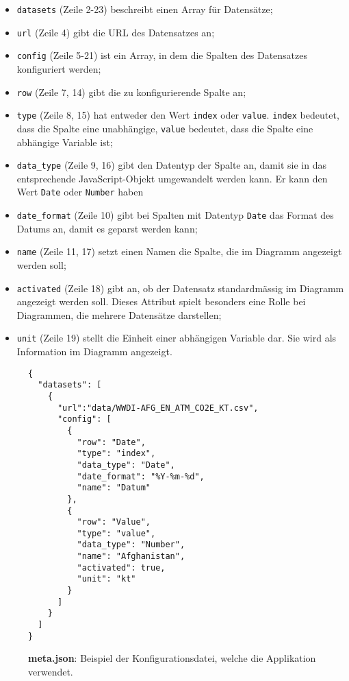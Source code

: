 \begin{itemize}
	\item \texttt{datasets} (Zeile 2-23) beschreibt einen Array für Datensätze;
	\item \texttt{url} (Zeile 4) gibt die URL des Datensatzes an;
	\item \texttt{config} (Zeile 5-21) ist ein Array, in dem die Spalten des Datensatzes konfiguriert werden;
	\item \texttt{row} (Zeile 7, 14) gibt die zu konfigurierende Spalte an;
	\item \texttt{type} (Zeile 8, 15) hat entweder den Wert \texttt{index} oder \texttt{value}. \texttt{index} bedeutet, dass die Spalte eine unabhängige, \texttt{value} bedeutet, dass die Spalte eine abhängige Variable ist;
	\item \texttt{data\_type} (Zeile 9, 16) gibt den Datentyp der Spalte an, damit sie in das entsprechende JavaScript-Objekt umgewandelt werden kann. Er kann den Wert \texttt{Date} oder \texttt{Number} haben
	\item \texttt{date\_format} (Zeile 10) gibt bei Spalten mit Datentyp \texttt{Date} das Format des Datums an, damit es geparst werden kann;
	\item \texttt{name} (Zeile 11, 17) setzt einen Namen die Spalte, die im Diagramm angezeigt werden soll;
	\item \texttt{activated} (Zeile 18) gibt an, ob der Datensatz standardmässig im Diagramm angezeigt werden soll. Dieses Attribut spielt besonders eine Rolle bei Diagrammen, die mehrere Datensätze darstellen;
	\item \texttt{unit} (Zeile 19) stellt die Einheit einer abhängigen Variable dar. Sie wird als Information im Diagramm angezeigt.
\end{itemize}

\begin{figure}[!htbp]
	\centering
	\begin{verbatim}
{
  "datasets": [
    {
      "url":"data/WWDI-AFG_EN_ATM_CO2E_KT.csv",
      "config": [
        {
          "row": "Date",
          "type": "index",
          "data_type": "Date",
          "date_format": "%Y-%m-%d",
          "name": "Datum"
        },
        {
          "row": "Value",
          "type": "value",
          "data_type": "Number",
          "name": "Afghanistan",
          "activated": true,
          "unit": "kt"
        }
      ]
    }
  ]	
}
	\end{verbatim}
	
	
	\caption[Beispiel der Konfigurationsdatei: meta.json]{\textbf{meta.json}: Beispiel der Konfigurationsdatei, welche die Applikation verwendet.}
	\label{fig:meta}
\end{figure}
\newpage
